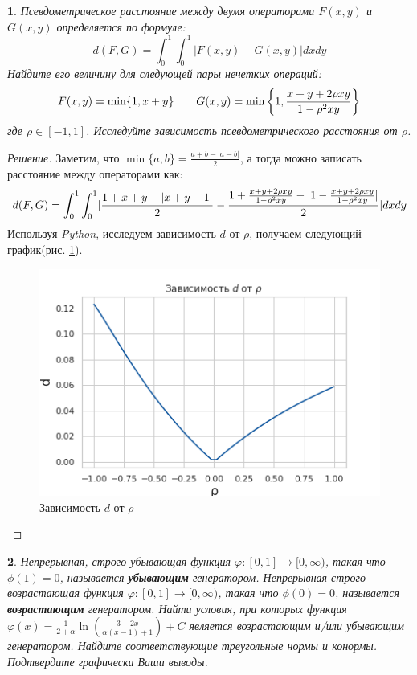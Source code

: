 \documentclass[11pt,a4paper,oneside]{article}
\newenvironment{problem}{
	\medskip
	\begin{problem-internal}
	}{
	\end{problem-internal}
}
\newenvironment{solution}{
	\begin{proof}[Решение]
		\vspace{-8px}
		\setlength{\parskip}{4px}
		\setlength{\parindent}{0px}
	}{
	\end{proof}
}
\newtheorem{problem-internal}{}
\DeclarePairedDelimiter\abs{\lvert}{\rvert}%
\begin{document}
	\begin{problem}
		Псевдометрическое расстояние между двумя операторами $F(x,y)$ и $G(x,y)$ определяется по формуле:
		\[ d(F,G) = \int_0^1\int_0^1 |F(x,y) - G(x,y)|dxdy \]
		Найдите его величину для следующей пары нечетких операций:
		\begin{equation*}
		\centering
		\begin{aligned}
		F(x,y) = \min\{1, x+y\}
		\end{aligned}
		\quad\quad
		\centering
		\begin{aligned}
		G(x,y) = \min\left\{1, \frac{x+y+2\rho xy}{1 - \rho^2xy} \right\}
		\end{aligned}
		\end{equation*}
		где $ \rho \in [-1,1] $. Исследуйте зависимость псевдометрического расстояния от $\rho$.
	\end{problem}
	\begin{solution}
		Заметим, что $\min\{a,b\} = \frac{a + b - |a-b|}{2}$, а тогда можно записать расстояние между операторами как:
		\[
			d(F,G) = \int_0^1\int_0^1 \abs{\frac{1 + x+y - \abs{x+y-1}}{2} - \frac{1 + \frac{x+y+2\rho xy}{1 - \rho^2xy} - \abs{ 1 - \frac{x+y+2\rho xy}{1 - \rho^2xy}}}{2} }dxdy
		\]
		Используя {\it Python}, исследуем зависимость $d$ от $\rho$, получаем следующий график(рис. \ref{fig:3task}).
		\begin{figure}[!hbtp]
			\centering
			\includegraphics[width=\linewidth]{3task.png}
			\caption{Зависимость $d$ от $\rho$}
			\label{fig:3task}
		\end{figure}
	\end{solution}
	\newpage
	\begin{problem}
		Непрерывная, строго убывающая функция $ \varphi\colon[0,1] \rightarrow [0, \infty)$, такая что $ \phi(1) = 0$, называется {\bf убывающим} генератором.
		\newline
		Непрерывная строго возрастающая функция $ \varphi\colon[0,1] \rightarrow [0, \infty)$, такая что $ \phi(0) = 0$, называется {\bf возрастающим} генератором.
		\newline
		Найти условия, при которых функция $ \varphi(x) = \frac{1}{2+\alpha}\ln \left( \frac{3-2x}{\alpha(x-1) + 1} \right) + C$ является возрастающим и/или убывающим генератором. Найдите соответствующие треугольные нормы и конормы. Подтвердите графически Ваши выводы.
	\end{problem}
\end{document}
